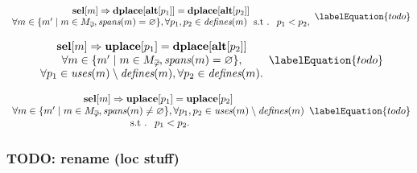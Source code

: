 \begin{equation}
  \begin{array}{c}
    \mVar{sel}[m]
    \mImp
    \mVar{dplace}[\mVar{alt}[p_1]] = \mVar{dplace}[\mVar{alt}[p_2]] \\
    \forall m \in
      \mSetBuilder{m'}%
                  {%
                    m \in \mPhiMatchCompSet \hspace{-1pt},
                    \mSpans(m) = \mEmptySet
                  },
    \forall p_1, p_2 \in \mDefines(m) \text{ \st } p_1 < p_2,
  \end{array}
  \labelEquation{todo}
\end{equation}

\begin{equation}
  \begin{array}{c}
    \mVar{sel}[m]
    \mImp
    \mVar{uplace}[p_1] = \mVar{dplace}[\mVar{alt}[p_2]] \\
    \forall m \in
      \mSetBuilder{m'}%
                  {%
                    m \in \mPhiMatchCompSet \hspace{-1pt},
                    \mSpans(m) = \mEmptySet
                  }, \\
    \forall p_1 \in \mUses(m) \setminus \mDefines(m),
    \forall p_2 \in \mDefines(m).
  \end{array}
  \labelEquation{todo}
\end{equation}



\begin{equation}
  \begin{array}{c}
    \mVar{sel}[m] \mImp \mVar{uplace}[p_1] = \mVar{uplace}[p_2] \\
    \forall m \in
      \mSetBuilder{m'}%
                  {%
                    m \in \mPhiMatchCompSet \hspace{-1pt},
                    \mSpans(m) \neq \mEmptySet
                  },
    \forall p_1, p_2 \in \mUses(m) \setminus \mDefines(m) \\
    \text{\st } p_1 < p_2.
  \end{array}
  \labelEquation{todo}
\end{equation}


\subsubsection{TODO: rename (loc stuff)}

